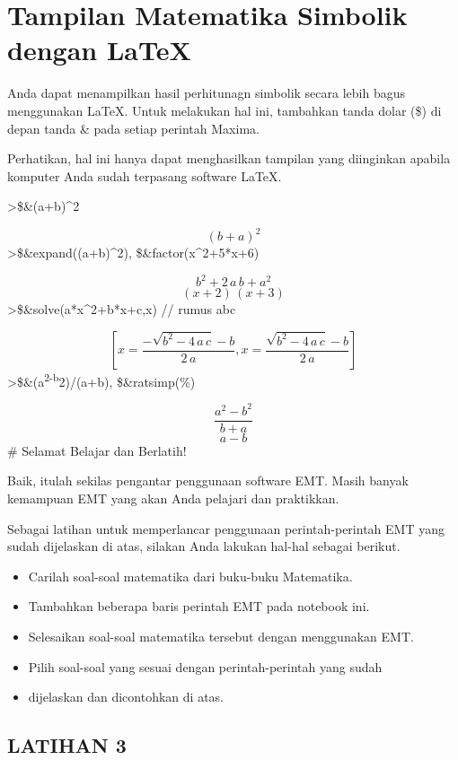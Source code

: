 \documentclass[
]{book}
\begin{document}
\chapter{Tampilan Matematika Simbolik dengan LaTeX}\label{tampilan-matematika-simbolik-dengan-latex}

Anda dapat menampilkan hasil perhitunagn simbolik secara lebih bagus menggunakan LaTeX. Untuk melakukan hal ini, tambahkan tanda dolar (\$) di depan tanda \& pada setiap perintah Maxima.

Perhatikan, hal ini hanya dapat menghasilkan tampilan yang diinginkan apabila komputer Anda sudah terpasang software LaTeX.

\textgreater\$\&(a+b)\^{}2

\[\left(b+a\right)^2\]\textgreater\$\&expand((a+b)\^{}2), \$\&factor(x\^{}2+5*x+6)

\[b^2+2\,a\,b+a^2\]\[\left(x+2\right)\,\left(x+3\right)\]\textgreater\$\&solve(a*x\^{}2+b*x+c,x) // rumus abc

\[\left[ x=\frac{-\sqrt{b^2-4\,a\,c}-b}{2\,a} , x=\frac{\sqrt{b^2-4\,
 a\,c}-b}{2\,a} \right] \]\textgreater\$\&(a\textsuperscript{2-b}2)/(a+b), \$\&ratsimp(\%)

\[\frac{a^2-b^2}{b+a}\]\[a-b\]\# Selamat Belajar dan Berlatih!

Baik, itulah sekilas pengantar penggunaan software EMT. Masih banyak kemampuan EMT yang akan Anda pelajari dan praktikkan.

Sebagai latihan untuk memperlancar penggunaan perintah-perintah EMT yang sudah dijelaskan di atas, silakan Anda lakukan hal-hal sebagai berikut.

\begin{itemize}
\item
  Carilah soal-soal matematika dari buku-buku Matematika.
\item
  Tambahkan beberapa baris perintah EMT pada notebook ini.
\item
  Selesaikan soal-soal matematika tersebut dengan menggunakan EMT.
\item
  Pilih soal-soal yang sesuai dengan perintah-perintah yang sudah
\item
  dijelaskan dan dicontohkan di atas.
\end{itemize}

\section{LATIHAN 3}\label{latihan-3}
\end{document}
